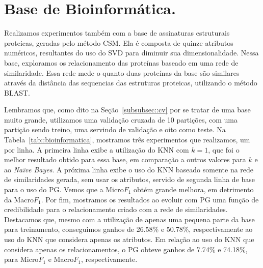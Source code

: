 


\section{Base de Bioinformática.}
\label{sec::bioinfo}

Realizamos experimentos também com a base de assinaturas estruturais proteicas, geradas pelo método \textsc{CSM}.
Ela é composta de quinze atributos numéricos, resultantes do uso do \textsc{SVD} para diminuir sua dimensionalidade.
Nessa base, exploramos os relacionamento das proteínas baseado em uma rede de similaridade.
Essa rede mede o quanto duas proteínas da base são similares através da distância das sequencias das estruturas proteicas, utilizando o método \textsc{BLAST}.

Lembramos que, como dito na Seção~\ref{subsubsec::cv} por se tratar de uma base muito grande, utilizamos uma validação cruzada de 10 partições, com uma partição sendo treino, uma servindo de validação e oito como teste. Na Tabela~\ref{tab::bioinformatica}, mostramos três experimentos que realizamos, um por linha. A primeira linha exibe a utilização do \textsc{KNN} com $k = 1$, que foi o melhor resultado obtido para essa base, em comparação a outros valores para $k$ e ao \textit{Naïve Bayes}. 
A próxima linha exibe o uso do \textsc{KNN} baseado somente na rede de similaridades gerada, sem usar os atributos, servido de segunda linha de base para o uso do \textsc{PG}.
Vemos que a Micro$F_1$ obtém grande melhora, em detrimento da Macro$F_1$. 
Por fim, mostramos os resultados ao evoluir com \textsc{PG} uma função de credibilidade para o relacionamento criado com a rede de similaridades.
Destacamos que, mesmo com a utilização de apenas uma pequena parte da base para treinamento, conseguimos ganhos de 26.58\% e 50.78\%, respectivamente ao uso do \textsc{KNN} que considera apenas os atributos. Em relação ao uso do \textsc{KNN} que considera apenas os relacionamentos, o \textsc{PG} obteve ganhos de 7.74\% e 74.18\%, para Micro$F_1$ e Macro$F_1$, respectivamente.

